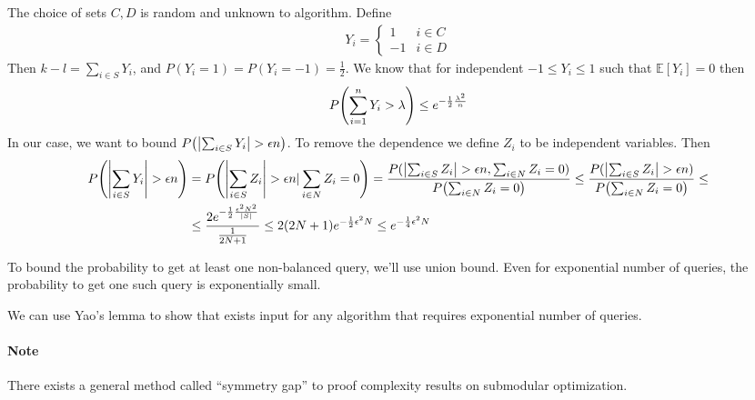 \begin{theorem}
	The choice of sets $C,D$ is random and unknown to algorithm. Define 
	\begin{align}
	Y_i = \begin{cases}
	1 & i\in C\\
	-1 & i\in D
	\end{cases}
	\end{align}
	Then $k-l = \sum_{i \in S} Y_i$, and $P(Y_i=1)=P(Y_i=-1)=\frac{1}{2}$. We know that for independent $-1\leq Y_i\leq 1$ such that $\mathbb{E} [Y_i] = 0$ then
	\begin{align}
		P\qty(\sum_{i =1}^n Y_i > \lambda) \leq e^{-\frac{1}{2}\frac{\lambda^2}{n}}
	\end{align}
	In our case, we want to bound $P\qty(\abs{\sum_{i \in S} Y_i} > \epsilon n)$. To remove the dependence we define $Z_i$ to be independent variables. Then
	\begin{align}
	P\qty(\abs{\sum_{i \in S} Y_i} > \epsilon n) &= 	P\qty(\abs{\sum_{i \in S} Z_i} > \epsilon n | \sum_{i\in N} Z_i = 0)  = \frac{P(\abs{\sum_{i \in S} Z_i} > \epsilon n , \sum_{i\in N} Z_i = 0)}{P\qty(\sum_{i\in N} Z_i = 0)} \leq \frac{P(\abs{\sum_{i \in S} Z_i} > \epsilon n)}{P\qty(\sum_{i\in N} Z_i = 0)} \leq\\&\leq \frac{2e^{-\frac{1}{2} \frac{\epsilon^2 N^2}{\abs{S}}}}{\frac{1}{2N+1}} \leq 2(2N+1)e^{-\frac{1}{2} \epsilon^2 N} \leq e^{-\frac{1}{4} \epsilon^2 N}
	\end{align}
	
	To bound the probability to get at least one non-balanced query, we'll use union bound. Even for exponential number of queries, the probability to get one such query is exponentially small.
	
	We can use Yao's lemma to show that exists input for any algorithm that requires exponential number of queries.
\end{theorem}


\paragraph{Note} There exists a general method called ``symmetry gap'' \cite{vondrak2013symmetry} to proof complexity results on submodular optimization.